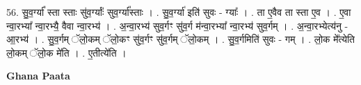 \documentclass[17pt]{extarticle}
\begin{document}
56. सु॒व॒र्ग्या᳚ स्ता स्ताः सु॑व॒र्ग्याः᳚ सुव॒र्ग्या᳚स्ताः । . सु॒व॒र्ग्या॑ इति॑ सुवः - ग्याः᳚ । . ता ए॒वैव ता स्ता ए॒व । . ए॒वा न्वा॒रभ्या᳚ न्वा॒रभ्यै॒ वैवा न्वा॒रभ्य॑ । . अ॒न्वा॒रभ्य॑ सुव॒र्गꣳ सु॑व॒र्ग म॑न्वा॒रभ्या᳚ न्वा॒रभ्य॑ सुव॒र्गम् । . अ॒न्वा॒रभ्येत्य॑नु - आ॒रभ्य॑ । . सु॒व॒र्गम् ॅलो॒कम् ॅलो॒कꣳ सु॑व॒र्गꣳ सु॑व॒र्गम् ॅलो॒कम् । . सु॒व॒र्गमिति॑ सुवः - गम् । . लो॒क मे᳚त्येति लो॒कम् ॅलो॒क मे॑ति । . ए॒तीत्ये॑ति । \newline

\textbf{Ghana Paata } \newline
\end{document}
